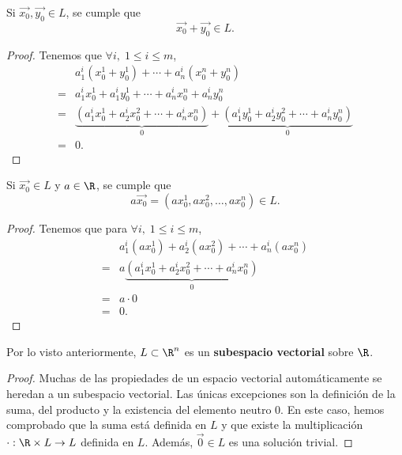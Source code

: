 \begin{ftheorem}[]
\normalfont Si $\displaystyle \vec{x_{0}}, \vec{y_{0}}\in L $, se cumple que 
\[\vec{x_{0}}+\vec{y_{0}}\in L .\]
\end{ftheorem}

\begin{proof}
Tenemos que $\displaystyle \forall i, \; 1 \leq i \leq m $, 
\[
\begin{split}
& a^{i}_{1}\left(x_{0}^{1}+y_{0}^{1}\right) + \cdots + a^{i}_{n}\left(x^{n}_{0}+y^{n}_{0}\right) \\
= & a^{i}_{1}x^{1}_{0}+a^{i}_{1}y^{1}_{0}+\cdots+a^{i}_{n}x^{n}_{0}+a^{i}_{n}y^{n}_{0} \\
= & \underbrace{\left(a^{i}_{1}x_{0}^{1}+a^{i}_{2}x^{2}_{0}+\cdots+a^{i}_{n}x^{n}_{0}\right)}_{0} + \underbrace{(a^{i}_{1}y^{1}_{0}+a^{i}_{2}y^{2}_{0}+\cdots+a^{i}_{n}y^{n}_{0})}_{0}\\
= & 0 .
\end{split}
\]
\end{proof}

\begin{ftheorem}[]
\normalfont Si $\displaystyle \vec{x_{0}}\in L $ y $\displaystyle a \in \R $, se cumple que 
\[a \vec{x_{0}}=\left(ax_{0}^{1}, ax^{2}_{0}, \ldots, a x^{n}_{0}\right) \in L .\]
\end{ftheorem}

\begin{proof}
Tenemos que para $\displaystyle \forall i, \; 1 \leq i \leq m $, 
\[
\begin{split}
& a^{i}_{1}\left(ax^{1}_{0}\right)+a^{i}_{2}\left(ax^{2}_{0}\right)+\cdots+a^{i}_{n}\left(ax^{n}_{0}\right) \\
= & a \underbrace{(a^{i}_{1}x^{1}_{0}+a^{i}_{2}x^{2}_{0}+\cdots+a^{i}_{n}x^{n}_{0})}_{0} \\
= & a \cdot 0 \\
= & 0 .
\end{split}
\]
\end{proof}

\begin{ftheorem}[]
\normalfont Por lo visto anteriormente, $\displaystyle L \subset \R^{n} $ es un \textbf{subespacio vectorial} sobre $\displaystyle \R $. 
\end{ftheorem}

\begin{proof}
Muchas de las propiedades de un espacio vectorial automáticamente se heredan a un subespacio vectorial. Las únicas excepciones son la definición de la suma, del producto y la existencia del elemento neutro $\displaystyle 0 $. En este caso, hemos comprobado que la suma está definida en $\displaystyle L $ y que existe la multiplicación $\displaystyle \cdot:\R\times L \to L  $ definida en $\displaystyle L $. Además, $\displaystyle \vec{0}\in L $ es una solución trivial.
\end{proof}

